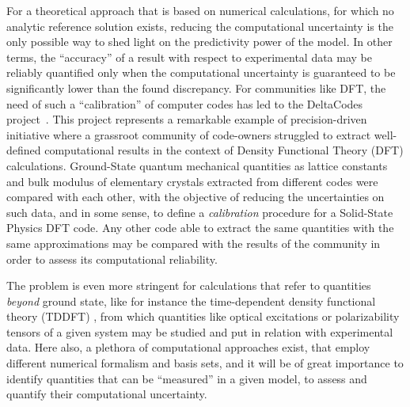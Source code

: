 \documentclass[reprint,aps,prb]{revtex4-1}
\begin{document}
For a theoretical approach that is based on numerical calculations, for which no analytic reference solution exists,
reducing the computational uncertainty is the only possible way to shed light on the predictivity power of the
model. In other terms, the ``accuracy'' of a result with respect to experimental data may be reliably quantified
only when the computational uncertainty is guaranteed to be significantly lower than the found discrepancy.
For communities like DFT, the need of such a ``calibration'' of computer codes has led to the DeltaCodes project~\cite{deltaTest2016}. 
This project represents a remarkable example of precision-driven initiative where a grassroot community of code-owners struggled to extract 
well-defined computational results in the context of Density Functional Theory (DFT) calculations. Ground-State quantum mechanical quantities 
as lattice constants and bulk modulus of elementary crystals extracted from different codes were compared with each other, with the objective of reducing the uncertainties on such data, and in some sense, to define a \emph{calibration} procedure for a Solid-State Physics DFT code.
Any other code able to extract the same quantities with the same approximations may be compared with the
results of the community in order to assess its computational reliability.


The problem is even more stringent for calculations that refer to quantities \emph{beyond} ground state, like
for instance the time-dependent density functional theory (TDDFT) \cite{casida1995,runge1984,onida2002},
from which quantities like optical excitations or polarizability tensors
of a given system may be studied and put in relation with experimental data.
Here also, a plethora of computational approaches exist, that employ different numerical formalism and
basis sets, and it will be of great importance to identify quantities that can be ``measured'' in a given model, to assess
and quantify their computational uncertainty.
\end{document}
